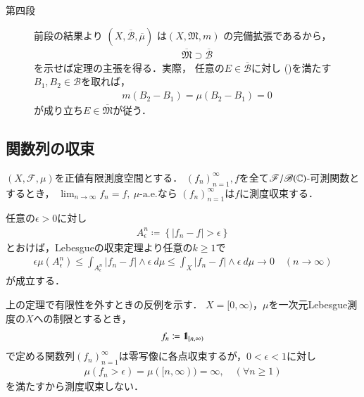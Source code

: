 \begin{prf}
\begin{description}
				\item[第四段]
					前段の結果より
					$\left(X, \overline{\mathcal{B}}, \overline{\mu} \right)$
					は$\left( X, \mathfrak{M}, m \right)$
					の完備拡張であるから，
					\begin{align}
						\overline{\mathfrak{M}}
						\supset \overline{\mathcal{B}}
					\end{align}
					を示せば定理の主張を得る．実際，
					任意の$E \in \overline{\mathcal{B}}$に対し
					()を満たす
					$B_1,B_2 \in \mathcal{B}$を取れば，
					\begin{align}
						m(B_2-B_1)
						= \mu(B_2-B_1)
						= 0
					\end{align}
					が成り立ち$E \in \overline{\mathfrak{M}}$が従う．
					\QED
			\end{description}
		\end{prf}
	
	\subsection{関数列の収束}
		\begin{screen}
			\begin{dfn}[概収束すれば測度収束する]
				$(X,\mathscr{F},\mu)$を正値有限測度空間とする．
				$(f_n)_{n=1}^\infty,f$を全て$\mathscr{F}/\mathscr{B}(\mathbb{C})$-可測関数とするとき，
				$\lim_{n \to \infty} f_n = f,\ \mbox{$\mu$-a.e.}$なら
				$(f_n)_{n=1}^\infty$は$f$に測度収束する．
			\end{dfn}
		\end{screen}
		
		\begin{prf}
			任意の$\epsilon > 0$に対し
			\begin{align}
				A^n_\epsilon \coloneqq \left\{ |f_n - f| > \epsilon \right\}
			\end{align}
			とおけば，Lebesgueの収束定理より任意の$k \geq 1$で
			\begin{align}
				\epsilon \mu\left(A^n_\epsilon\right)
				\leq \int_{A^n_\epsilon} |f_n - f| \wedge \epsilon\ d\mu
				\leq \int_{X} |f_n - f| \wedge \epsilon\ d\mu
				\longrightarrow 0
				\quad (n \longrightarrow \infty)
			\end{align}
			が成立する．
			\QED
		\end{prf}
		
		上の定理で有限性を外すときの反例を示す．
		$X = [0,\infty)$，$\mu$を一次元Lebesgue測度の$X$への制限とするとき，
		\begin{align}
			f_n \coloneqq \mbox{1}\hspace{-0.25em}\mbox{l}_{[n,\infty)}
		\end{align}
		で定める関数列$(f_n)_{n=1}^\infty$は零写像に各点収束するが，$0 < \epsilon < 1$に対し
		\begin{align}
			\mu\left( f_n > \epsilon \right) = \mu([n,\infty)) = \infty,
			\quad (\forall n \geq 1)
		\end{align}
		を満たすから測度収束しない．
		
